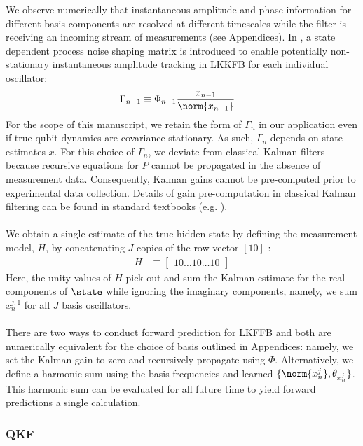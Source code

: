 We observe numerically that instantaneous amplitude and phase information for different basis components are resolved at different timescales while the filter is receiving an incoming stream of measurements (see Appendices). In \cite{livska2007}, a state dependent process noise shaping matrix is introduced to enable potentially non-stationary instantaneous amplitude tracking in LKKFB for each individual oscillator: 
\begin{align}
\Gamma_{n-1} &\equiv \Phi_{n-1}\frac{x_{n-1}}{\norm{x_{n-1}}}
\end{align}
For the scope of this manuscript, we retain the form of $\Gamma_{n}$ in our application even if true qubit dynamics are covariance stationary. As such, $\Gamma_{n}$ depends on state estimates $x$. For this choice of $\Gamma_{n}$, we deviate from classical Kalman filters because recursive equations for $P$ cannot be propagated in the absence of measurement data. Consequently, Kalman gains cannot be pre-computed prior to experimental data collection. Details of gain pre-computation in classical Kalman filtering can be found in standard textbooks (e.g. \cite{grewal2001theory}).
\\
\\
We obtain a single estimate of the true hidden state by defining the measurement model, $H$, by concatenating $J$ copies of the row vector $[1 0]$ :
\begin{align}
H & \equiv \begin{bmatrix} 1 0 \hdots 1 0 \hdots 1 0 \end{bmatrix}
\end{align}
Here, the unity values of $H$ pick out and sum the Kalman estimate for the real components of $\state$ while ignoring the imaginary components, namely, we sum $x^{j,1}_{n}$ for all $J$ basis oscillators.
\\
\\
There are two ways to conduct forward prediction for LKFFB and both are numerically equivalent for the choice of basis outlined in Appendices: namely, we set the Kalman gain to zero and recursively propagate using $\Phi$. Alternatively, we define a harmonic sum using the basis frequencies and learned $\{\norm{x^j_n}, \theta_{x^j_n} \}$.  This harmonic sum can be evaluated for all future time to yield forward predictions a single calculation. 

\subsubsection{QKF}

